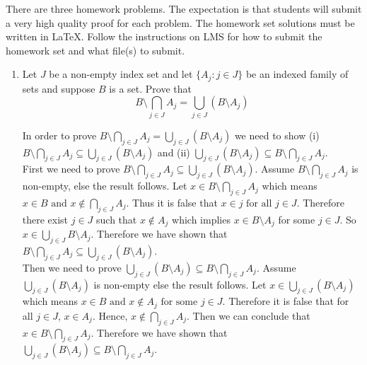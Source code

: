\documentclass{article}
\begin{document}

There are three homework problems. The expectation is that students
will submit a very high quality proof for each problem. The homework set solutions must be written
in LaTeX. Follow the instructions on LMS for how to submit the homework set and what file(s) to submit.


\begin{enumerate}
\bigskip
\item  Let $J$ be a non-empty index set and let $\{A_j:j \in J\}$ be an indexed family of sets and suppose $B$ is a set. 
Prove that $$B  \setminus \bigcap_{j \in J} A_j = \bigcup_{j \in J} \left(B \setminus A_j\right)$$  
\bigskip
\vspace{.15in}

 In order to prove $ B  \setminus \bigcap_{j \in J} A_j = \bigcup_{j \in J} (B \setminus A_j)$ we need to show (i) $B \setminus \bigcap_{j \in J} A_j  \subseteq \bigcup_{j \in J} (B \setminus A_j) $  and (ii) $\bigcup_{j \in J} (B \setminus A_j)  \subseteq B \setminus \bigcap_{j \in J} A_j$. \\

First we need to prove $B \setminus \bigcap_{j \in J} A_j  \subseteq \bigcup_{j \in J} (B \setminus A_j) $. Assume $B \setminus \bigcap_{j \in J} A_j$ is non-empty, else the result follows. Let $x \in B \setminus \bigcap_{j \in J} A_j$ which means $x \in B \text{ and } x \notin \bigcap_{j \in J}A_j$. Thus it is false that $x \in j \text{ for all } j \in J$. Therefore there exist $j \in J$ such that $x \notin A_j$ which implies $x \in B \setminus A_{j}$ for some $j \in J$. So $x \in \bigcup_{j \in J} B \setminus A_j$. Therefore we have shown that $B \setminus \bigcap_{j \in J} A_j  \subseteq \bigcup_{j \in J} (B \setminus A_j) $.\\
                    
Then we need to prove $\bigcup_{j \in J} (B \setminus A_j)  \subseteq B \setminus \bigcap_{j \in J} A_j$. Assume $\bigcup_{j \in J} (B \setminus A_j)$ is non-empty else the result follows. Let $x \in \bigcup_{j \in J} (B \setminus A_j)$ which means $x \in B \text{ and } x \notin A_j \text{ for some } j \in J$. Therefore it is false that for all $j \in J$, $x \in A_j$. Hence, $x \notin \bigcap_{j \in J} A_j$. Then we can conclude that $x \in B \setminus \bigcap_{j \in J} A_j$. Therefore we have shown that  $\bigcup_{j \in J} (B \setminus A_j)  \subseteq B \setminus \bigcap_{j \in J} A_j$.\\


\end{enumerate}
\end{document}
